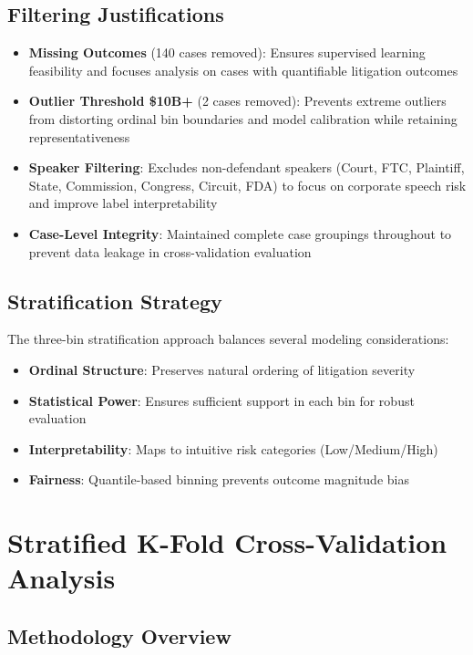 \documentclass[11pt]{article}
\begin{document}
\subsection{Filtering Justifications}

\begin{itemize}
\item \textbf{Missing Outcomes} (140 cases removed): Ensures supervised learning feasibility and focuses analysis on cases with quantifiable litigation outcomes
\item \textbf{Outlier Threshold \$10B+} (2 cases removed): Prevents extreme outliers from distorting ordinal bin boundaries and model calibration while retaining representativeness
\item \textbf{Speaker Filtering}: Excludes non-defendant speakers (Court, FTC, Plaintiff, State, Commission, Congress, Circuit, FDA) to focus on corporate speech risk and improve label interpretability
\item \textbf{Case-Level Integrity}: Maintained complete case groupings throughout to prevent data leakage in cross-validation evaluation
\end{itemize}

\subsection{Stratification Strategy}

The three-bin stratification approach balances several modeling considerations:
\begin{itemize}
\item \textbf{Ordinal Structure}: Preserves natural ordering of litigation severity
\item \textbf{Statistical Power}: Ensures sufficient support in each bin for robust evaluation
\item \textbf{Interpretability}: Maps to intuitive risk categories (Low/Medium/High)
\item \textbf{Fairness}: Quantile-based binning prevents outcome magnitude bias
\end{itemize}



\section{Stratified K-Fold Cross-Validation Analysis}

\subsection{Methodology Overview}
\end{document}
